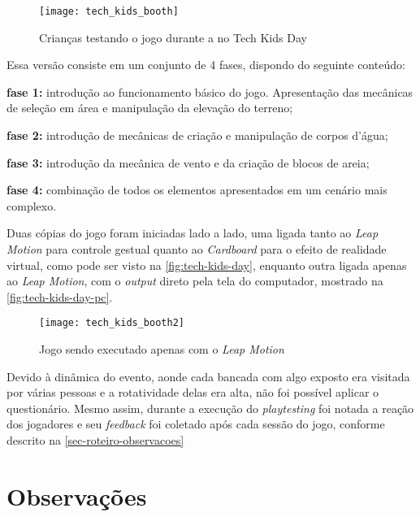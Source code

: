 \begin{figure}[h]
	\centering
	\caption{Crianças testando o jogo durante a no Tech Kids Day}
	\texttt{[image: tech\_kids\_booth]}
	\legend{\fonteAP}
	\label{fig:tech-kids-day}
\end{figure}

Essa versão consiste em um conjunto de 4 fases, dispondo do seguinte conteúdo:

\begin{alineas}
	\item \textbf{fase 1:} introdução ao funcionamento básico do jogo. Apresentação das mecânicas de seleção em área e manipulação da elevação do terreno;
	\item \textbf{fase 2:} introdução de mecânicas de criação e manipulação de corpos d'água;
	\item \textbf{fase 3:} introdução da mecânica de vento e da criação de blocos de areia;
	\item \textbf{fase 4:} combinação de todos os elementos apresentados em um cenário mais complexo.
\end{alineas}

Duas cópias do jogo foram iniciadas lado a lado, uma ligada tanto 
ao \textit{Leap Motion} para controle gestual quanto ao \textit{Cardboard} 
para o efeito de realidade virtual, como pode ser visto 
na \autoref{fig:tech-kids-day}, enquanto outra ligada apenas ao 
\textit{Leap Motion}, com o \textit{output} direto pela tela do computador, 
mostrado na \autoref{fig:tech-kids-day-pc}.

\begin{figure}[h]
	\centering
	\caption{Jogo sendo executado apenas com o \textit{Leap Motion}}
	\texttt{[image: tech\_kids\_booth2]}
	\legend{\fonteAP}
	\label{fig:tech-kids-day-pc}
\end{figure}

Devido à dinâmica do evento, aonde cada bancada com algo exposto 
era visitada por várias pessoas e a rotatividade delas era alta, 
não foi possível aplicar o questionário. Mesmo assim, durante a 
execução do \textit{playtesting} 
foi notada a reação dos 
jogadores e seu \textit{feedback} foi coletado após cada sessão do jogo, 
conforme descrito na \autoref{sec-roteiro-observacoes}

\section{Observações}\label{sec-roteiro-observacoes}

